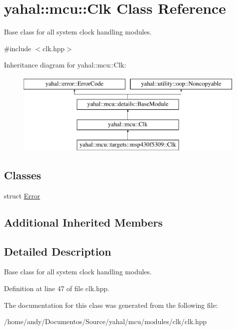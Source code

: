 \hypertarget{classyahal_1_1mcu_1_1_clk}{}\section{yahal\+:\+:mcu\+:\+:Clk Class Reference}
\label{classyahal_1_1mcu_1_1_clk}


Base class for all system clock handling modules.  




{\ttfamily \#include $<$clk.\+hpp$>$}

Inheritance diagram for yahal\+:\+:mcu\+:\+:Clk\+:\begin{figure}[H]
\begin{center}
\leavevmode
\includegraphics[height=4.000000cm]{classyahal_1_1mcu_1_1_clk}
\end{center}
\end{figure}
\subsection*{Classes}
\begin{DoxyCompactItemize}
\item 
struct \hyperlink{structyahal_1_1mcu_1_1_clk_1_1_error}{Error}
\end{DoxyCompactItemize}
\subsection*{Additional Inherited Members}


\subsection{Detailed Description}
Base class for all system clock handling modules. 

Definition at line 47 of file clk.\+hpp.



The documentation for this class was generated from the following file\+:\begin{DoxyCompactItemize}
\item 
/home/andy/\+Documentos/\+Source/yahal/mcu/modules/clk/clk.\+hpp\end{DoxyCompactItemize}
